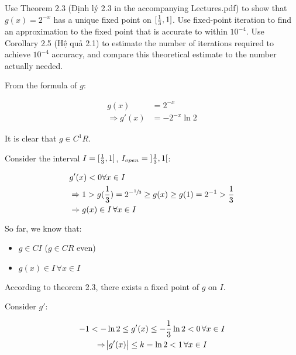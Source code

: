 \documentclass[../../../../Assignments]{subfiles}
\begin{document}
\begin{exercise}
    Use Theorem 2.3 (Định lý 2.3 in the accompanying Lectures.pdf) to show that
    \(g(x) = 2^{-x}\) has a unique fixed point on \(\interval{\frac{1}{3}}{1}\).
    Use fixed-point iteration to find an approximation to the fixed point that
    is accurate to within \(10^{-4}\). Use Corollary 2.5 (Hệ quả 2.1) to
    estimate the number of iterations required to achieve \(10^{-4}\) accuracy,
    and compare this theoretical estimate to the number actually needed.
\end{exercise}

\begin{solution}
    From the formula of \(g\):

    \[\begin{aligned}
                     g(x) & = 2^{-x} \\
        \Rightarrow g'(x) & = - 2^{-x} \ln{2}
    \end{aligned}\]

    It is clear that \(g \in C^1 R\).

    Consider the interval \(I = \interval{\frac{1}{3}}{1}\), \(I_{open} =
    \interval[open]{\frac{1}{3}}{1}\):

    \[\begin{aligned}
        &g'(x) < 0 \forall x \in I \\
        &\Rightarrow 1 > g(\frac{1}{3}) = 2^{-\sfrac{1}{3}} \geq g(x) \geq g(1) = 2^{-1} > \frac{1}{3} \\
        &\Rightarrow g(x) \in I \, \forall x \in I
    \end{aligned}\]

    So far, we know that:

    \begin{itemize}
        \item \(g \in C I\) (\(g \in C R\) even)
        \item \(g(x) \in I \, \forall x \in I\)
    \end{itemize}

    According to theorem 2.3, there exists a fixed point of \(g\) on \(I\).

    Consider \(g'\):

    \begin{gather*}
        -1 < - \ln{2} \leq g'(x) \leq - \frac{1}{3} \ln{2} < 0 \, \forall x \in I \\
        \Rightarrow \abs{g'(x)} \leq k = \ln{2} < 1 \, \forall x \in I
    \end{gather*}


\end{solution}
\end{document}
